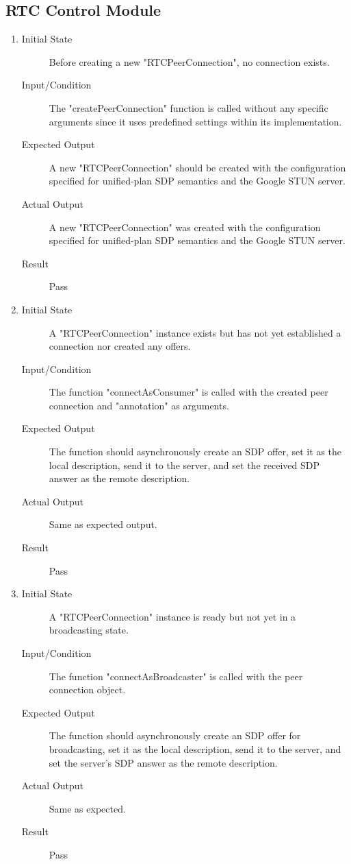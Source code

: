 \documentclass[12pt, titlepage]{article}
\begin{document}
\subsection{RTC Control Module}
\begin{enumerate}[UT-RC1]
  \item \label{UT-RC1}
    \begin{description}
    \item[Initial State] Before creating a new "RTCPeerConnection", no connection exists.
    \item[Input/Condition] The "createPeerConnection" function is called without any specific arguments since it uses predefined settings within its implementation.
    \item[Expected Output] A new "RTCPeerConnection" should be created with the configuration specified for unified-plan SDP semantics and the Google STUN server.
    \item[Actual Output] A new "RTCPeerConnection" was created with the configuration specified for unified-plan SDP semantics and the Google STUN server.
    \item[Result] Pass
    \end{description}
  \item \label{UT-RC2}
    \begin{description}
    \item[Initial State] A "RTCPeerConnection" instance exists but has not yet established a connection nor created any offers.
    \item[Input/Condition] The function "connectAsConsumer" is called with the created peer connection and "annotation" as arguments.
    \item[Expected Output] The function should asynchronously create an SDP offer, set it as the local description, send it to the server, and set the received SDP answer as the remote description.
    \item[Actual Output] Same as expected output.
    \item[Result] Pass
    \end{description}
  \item \label{UT-RC3}
    \begin{description}
    \item[Initial State]  A "RTCPeerConnection" instance is ready but not yet in a broadcasting state.
    \item[Input/Condition] The function "connectAsBroadcaster" is called with the peer connection object.
    \item[Expected Output] The function should asynchronously create an SDP offer for broadcasting, set it as the local description, send it to the server, and set the server's SDP answer as the remote description.
    \item[Actual Output] Same as expected.
    \item[Result] Pass
    \end{description}
\end{enumerate}
\end{document}
